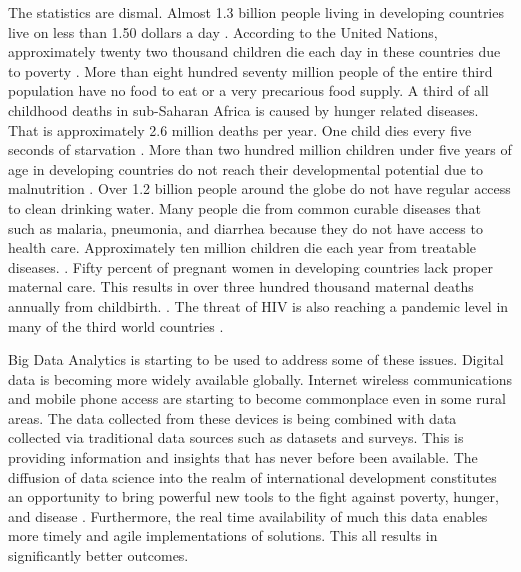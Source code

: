 \documentclass[sigconf]{acmart}
\begin{document}
The statistics are dismal. Almost 1.3 billion people living in developing countries live on less than 1.50 dollars a day \cite{www-google-top5}.  According to the United Nations, approximately twenty two thousand children die each day in these countries due to poverty \cite{www-google-top10}.   More than eight hundred seventy million people of the entire third population have no food to eat or a very precarious food supply. A third of all childhood deaths in sub-Saharan Africa is caused by hunger related diseases. That is approximately 2.6 million deaths per year. One child dies every five seconds of starvation \cite{www-google-top10}. More than two hundred million children under five years of age in developing countries do not reach their developmental potential due to malnutrition \cite{www-google-WikiDevC}.  Over 1.2 billion people around the globe do not have regular access to clean drinking water. Many people die from common curable diseases that such as malaria, pneumonia, and diarrhea because they do not have access to health care. Approximately ten million children die each year from treatable diseases. \cite{www-google-top5}.  Fifty percent of pregnant women in developing countries lack proper maternal care. This results in over three hundred thousand maternal deaths annually from childbirth.  \cite{www-google-top10}. The threat of HIV is also reaching a pandemic level in many of the third world countries \cite{www-google-top5}.

Big Data Analytics is starting to be used to address some of these issues. Digital data is becoming more widely available globally. Internet wireless communications and mobile phone access are starting to become commonplace even in some rural areas. The data collected from these devices is being combined with data collected via traditional data sources such as datasets and surveys. This is providing information and insights that has never before been available. The diffusion of data science into the realm of international development constitutes an opportunity to bring powerful new tools to the fight against poverty, hunger, and disease \cite{www-google-GloPls}. Furthermore, the real time availability of much this data enables more timely and agile implementations of solutions. This all results in significantly better outcomes.
\end{document}
